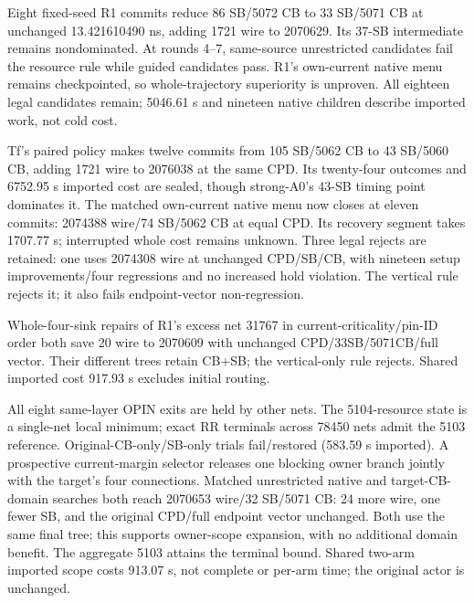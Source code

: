 \documentclass[conference,10pt]{IEEEtran}
\begin{document}
Eight fixed-seed R1 commits reduce 86 SB/5072 CB to 33 SB/5071 CB at unchanged 13.421610490 ns, adding 1721 wire to 2070629. Its 37-SB intermediate remains nondominated. At rounds 4--7, same-source unrestricted candidates fail the resource rule while guided candidates pass. R1's own-current native menu remains checkpointed, so whole-trajectory superiority is unproven. All eighteen legal candidates remain; 5046.61 s and nineteen native children describe imported work, not cold cost.

Tf's paired policy makes twelve commits from 105 SB/5062 CB to 43 SB/5060 CB, adding 1721 wire to 2076038 at the same CPD. Its twenty-four outcomes and 6752.95 s imported cost are sealed, though strong-A0's 43-SB timing point dominates it. The matched own-current native menu now closes at eleven commits: 2074388 wire/74 SB/5062 CB at equal CPD. Its recovery segment takes 1707.77 s; interrupted whole cost remains unknown. Three legal rejects are retained: one uses 2074308 wire at unchanged CPD/SB/CB, with nineteen setup improvements/four regressions and no increased hold violation. The vertical rule rejects it; it also fails endpoint-vector non-regression.

Whole-four-sink repairs of R1's excess net 31767 in current-criticality/pin-ID order both save 20 wire to 2070609 with unchanged CPD/33SB/5071CB/full vector. Their different trees retain CB+SB; the vertical-only rule rejects. Shared imported cost 917.93 s excludes initial routing.

All eight same-layer OPIN exits are held by other nets. The 5104-resource state is a single-net local minimum; exact RR terminals across 78450 nets admit the 5103 reference. Original-CB-only/SB-only trials fail/restored (583.59 s imported). A prospective current-margin selector releases one blocking owner branch jointly with the target's four connections. Matched unrestricted native and target-CB-domain searches both reach 2070653 wire/32 SB/5071 CB: 24 more wire, one fewer SB, and the original CPD/full endpoint vector unchanged. Both use the same final tree; this supports owner-scope expansion, with no additional domain benefit. The aggregate 5103 attains the terminal bound. Shared two-arm imported scope costs 913.07 s, not complete or per-arm time; the original actor is unchanged.
\end{document}
